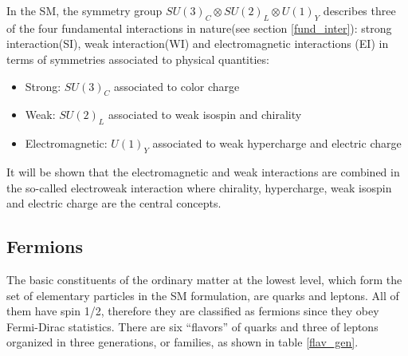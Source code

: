 \noindent In the SM, the symmetry group $SU(3)_C\otimes SU(2)_L\otimes U(1)_Y$ describes three of the four fundamental interactions in nature(see section \ref{fund_inter}): strong interaction(SI), weak interaction(WI) and electromagnetic interactions (EI) in terms of symmetries associated to physical quantities:
\begin{itemize}
\item Strong: $SU(3)_C$ associated to color charge
\item Weak: $SU(2)_L$ associated to weak isospin and chirality
\item Electromagnetic: $U(1)_Y$ associated to weak hypercharge and electric charge
\end{itemize}

\noindent It will be shown that the electromagnetic and weak interactions are combined in the so-called electroweak interaction where chirality, hypercharge, weak isospin and electric charge are the central concepts.

\subsection{Fermions}\label{fermions}

\noindent The basic constituents of the ordinary matter at the lowest level, which form the set of elementary particles in the SM formulation, are quarks and leptons. All of them have spin 1/2, therefore they are classified as fermions since they obey Fermi-Dirac statistics. There are six ``flavors'' of quarks and three of leptons organized in three generations, or families, as shown in table \ref{flav_gen}.\\
 
